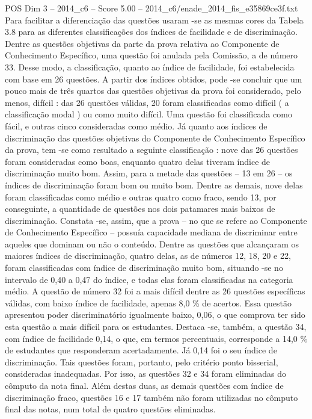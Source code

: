 \begin{textsample}{POS Dim 3 – 2014\_c6 – Score 5.00 – 2014\_c6/enade\_2014\_fis\_e35869ce3f.txt}
Para facilitar a diferenciação das questões usaram -se as mesmas cores da Tabela 3.8 para as diferentes classificações dos índices de facilidade e de discriminação.
Dentre as questões objetivas da parte da prova relativa ao Componente de Conhecimento Específico, uma questão foi anulada pela Comissão, a de número 33.
Desse modo, a classificação, quanto ao índice de facilidade, foi estabelecida com base em 26 questões.
A partir dos índices obtidos, pode -se concluir que um pouco mais de três quartos das questões objetivas da prova foi considerado, pelo menos, difícil : das 26 questões válidas, 20 foram classificadas como difícil ( a classificação modal ) ou como muito difícil.
Uma questão foi classificada como fácil, e outras cinco consideradas como médio.
Já quanto aos índices de discriminação das questões objetivas do Componente de Conhecimento Específico da prova, tem -se como resultado a seguinte classificação : nove das 26 questões foram consideradas como boas, enquanto quatro delas tiveram índice de discriminação muito bom.
Assim, para a metade das questões – 13 em 26 – os índices de discriminação foram bom ou muito bom.
Dentre as demais, nove delas foram classificadas como médio e outras quatro como fraco, sendo 13, por conseguinte, a quantidade de questões nos dois patamares mais baixos de discriminação.
Constata -se, assim, que a prova – no que se refere ao Componente de Conhecimento Específico – possuía capacidade mediana de discriminar entre aqueles que dominam ou não o conteúdo.
Dentre as questões que alcançaram os maiores índices de discriminação, quatro delas, as de números 12, 18, 20 e 22, foram classificadas com índice de discriminação muito bom, situando -se no intervalo de 0,40 a 0,47 do índice, e todas elas foram classificadas na categoria médio.
A questão de número 32 foi a mais difícil dentre as 26 questões específicas válidas, com baixo índice de facilidade, apenas 8,0 \% de acertos.
Essa questão apresentou poder discriminatório igualmente baixo, 0,06, o que comprova ter sido esta questão a mais difícil para os estudantes.
Destaca -se, também, a questão 34, com índice de facilidade 0,14, o que, em termos percentuais, corresponde a 14,0 \% de estudantes que responderam acertadamente.
Já 0,14 foi o seu índice de discriminação.
Tais questões foram, portanto, pelo critério ponto bisserial, consideradas inadequadas.
Por isso, as questões 32 e 34 foram eliminadas do cômputo da nota final.
Além destas duas, as demais questões com índice de discriminação fraco, questões 16 e 17 também não foram utilizadas no cômputo final das notas, num total de quatro questões eliminadas.

\end{textsample}
